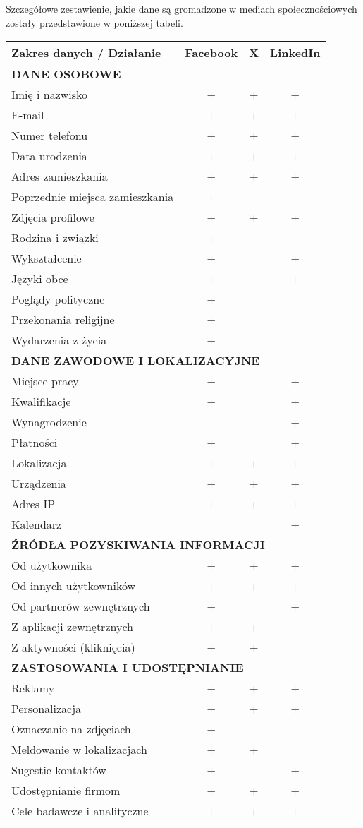 Szczegółowe zestawienie, jakie dane są gromadzone w mediach społecznościowych zostały przedstawione w poniższej tabeli. \cite{zrodloArtykul}
\begin{longtable}{p{8.5cm}|c|c|c}
\toprule
\textbf{Zakres danych / Działanie} & \textbf{Facebook} & \textbf{X} & \textbf{LinkedIn} \\
\midrule
\multicolumn{4}{l}{\textbf{DANE OSOBOWE}} \\
Imię i nazwisko & + & + & + \\
E-mail & + & + & + \\
Numer telefonu & + & + & + \\
Data urodzenia & + & + & + \\
Adres zamieszkania & + & + & + \\
Poprzednie miejsca zamieszkania & + &  &  \\
Zdjęcia profilowe & + & + & + \\
Rodzina i związki & + &  &  \\
Wykształcenie & + &  & + \\
Języki obce & + &  & + \\
Poglądy polityczne & + &  &  \\
Przekonania religijne & + &  &  \\
Wydarzenia z życia & + &  &  \\
\midrule
\multicolumn{4}{l}{\textbf{DANE ZAWODOWE I LOKALIZACYJNE}} \\
Miejsce pracy & + &  & + \\
Kwalifikacje & + &  & + \\
Wynagrodzenie &  &  & + \\
Płatności & + &  & + \\
Lokalizacja & + & + & + \\
Urządzenia & + & + & + \\
Adres IP & + & + & + \\
Kalendarz &  &  & + \\
\midrule
\multicolumn{4}{l}{\textbf{ŹRÓDŁA POZYSKIWANIA INFORMACJI}} \\
Od użytkownika & + & + & + \\
Od innych użytkowników & + & + & + \\
Od partnerów zewnętrznych & + &  & + \\
Z aplikacji zewnętrznych & + & + &  \\
Z aktywności (kliknięcia) & + & + &  \\
\midrule
\multicolumn{4}{l}{\textbf{ZASTOSOWANIA I UDOSTĘPNIANIE}} \\
Reklamy & + & + & + \\
Personalizacja & + & + & + \\
Oznaczanie na zdjęciach & + &  &  \\
Meldowanie w lokalizacjach & + & + &  \\
Sugestie kontaktów & + &  & + \\
Udostępnianie firmom & + & + & + \\
Cele badawcze i analityczne & + & + & + \\
\bottomrule
\end{longtable}

